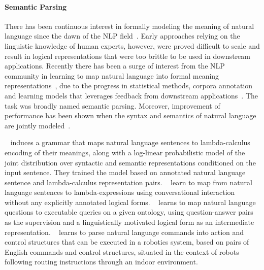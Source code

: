 \paragraph{Semantic Parsing} 
There has been continuous interest in formally modeling the meaning of natural language since the dawn of the NLP field~\cite{opac-b1080356}. Early approaches relying on the linguistic knowledge of human experts, however, were proved difficult to scale and result in logical representations that were too brittle to be used in downstream applications. 
Recently there has been a surge of interest from the NLP community in learning to map natural language into formal meaning representations~\cite{Zettlemoyer05learningto,Kwiatkowski:2011:LGC:2145432.2145593,DBLP:Poon13}, due to the progress in statistical methods, corpora annotation and learning models that leverages feedback from downstream applications~\cite{Artzi:2011:BSP:2145432.2145481,kwiatkowski-EtAl:2013:EMNLP,conf/iser/MatuszekHZF12}. The task was broadly named semantic parsing. Moreover, improvement of performance has been shown when the syntax and semantics of natural language are jointly modeled~\cite{Zettlemoyer05learningto,lewis2015joint}.

~\cite{Zettlemoyer05learningto} induces a grammar that maps natural language sentences to lambda-calculus encoding of their meanings, along with a log-linear probabilistic model of the joint distribution over syntactic and semantic representations conditioned on the input sentence. They trained the model based on annotated natural language sentence and lambda-calculus representation pairs.
~\cite{Artzi:2011:BSP:2145432.2145481} learn to map from natural language sentences to lambda-expressions using conversational interaction without any explicitly annotated logical forms.
~\cite{kwiatkowski-EtAl:2013:EMNLP} learns to map natural language questions to executable queries on a given ontology, using question-answer pairs as the supervision and a linguistically motivated logical form as an intermediate representation.
~\cite{conf/iser/MatuszekHZF12} learns to parse natural language commands into action and control structures that can be executed in a robotics system, based on pairs of English commands and control structures, situated in the context of robots following routing instructions through an indoor environment.

